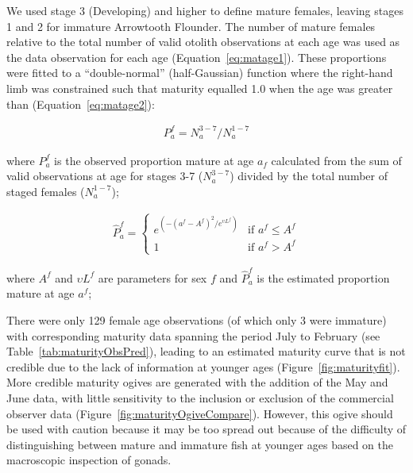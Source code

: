 We used stage 3 (Developing) and higher to define mature females, leaving stages 1 and 2 for immature Arrowtooth Flounder. The number of mature females relative to the total number of valid otolith observations at each age was used as the data observation for each age (Equation~\ref{eq:matage1}). These proportions were fitted to a “double-normal” (half-Gaussian) function where the right-hand limb was constrained such that maturity equalled 1.0 when the age was greater than (Equation~\ref{eq:matage2}):

\begin{align} \label{eq:matage1}
P_a^f=N_a^{3-7}/N_a^{1-7}
\end{align}
\begin{addmargin}[3em]{1em}
where $P_a^f$ is the observed proportion mature at age $a_f$ calculated from the sum of valid observations at age for stages 3-7 ($N_a^{3-7}$) divided by the total number of staged females ($N_a^{1-7}$);
\end{addmargin}

\begin{align} \label{eq:matage2}
\hat{P}_a^f=
  \begin{cases}
    e^{\left(-\left(a^f-A^f\right)^2/e^{{\upsilon}L^f}\right)} & \text{if } a^f \leq A^f \\
                                              1 & \text{if } a^f > A^f
  \end{cases}
\end{align}
\begin{addmargin}[3em]{1em}
where $A^f$ and ${\upsilon}L^f$ are parameters for sex $f$ and $\hat{P}_a^f$ is the estimated proportion mature at age $a^f$;
\end{addmargin}

There were only 129 female age observations (of which only 3 were immature) with corresponding maturity data spanning the period July to February (see Table~\ref{tab:maturityObsPred}), leading to an estimated maturity curve that is not credible due to the lack of information at younger ages (Figure~\ref{fig:maturityfit}). More credible maturity ogives are generated with the addition of the May and June data, with little sensitivity to the inclusion or exclusion of the commercial observer data (Figure~\ref{fig:maturityOgiveCompare}). However, this ogive should be used with caution because it may be too spread out because of the difficulty of distinguishing between mature and immature fish at younger ages based on the macroscopic inspection of gonads.

